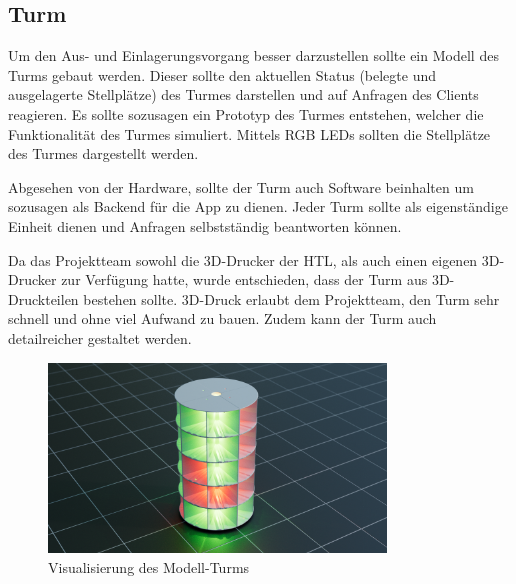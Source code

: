 \subsection{Turm}

Um den Aus- und Einlagerungsvorgang besser darzustellen sollte ein Modell des Turms gebaut werden. Dieser sollte den aktuellen Status (belegte und ausgelagerte Stellplätze) des Turmes darstellen und auf Anfragen des Clients reagieren. Es sollte sozusagen ein Prototyp des Turmes entstehen, welcher die Funktionalität des Turmes simuliert. Mittels RGB LEDs sollten die Stellplätze des Turmes dargestellt werden.

Abgesehen von der Hardware, sollte der Turm auch Software beinhalten um sozusagen als Backend für die App zu dienen. Jeder Turm sollte als eigenständige Einheit dienen und Anfragen selbstständig beantworten können.

Da das Projektteam sowohl die 3D-Drucker der HTL, als auch einen eigenen 3D-Drucker zur Verfügung hatte, wurde entschieden, dass der Turm aus 3D-Druckteilen bestehen sollte. 3D-Druck erlaubt dem Projektteam, den Turm sehr schnell und ohne viel Aufwand zu bauen. Zudem kann der Turm auch detailreicher gestaltet werden.

\begin{figure}[H]
  \centering
  \includegraphics[width=0.8\textwidth]{images/turm_modell.png}
  \caption{Visualisierung des Modell-Turms}
  \label{fig:turm}
\end{figure}